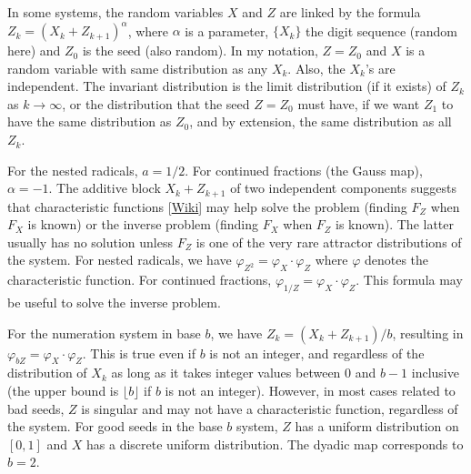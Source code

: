 \documentclass[oneside,10pt]{book}
\begin{document}
In some systems,  the random variables $X$ and $Z$
are linked by the formula $Z_{k} = (X_k +Z_{k+1})^\alpha$, where $\alpha$ is a parameter, $\{X_k\}$ the digit sequence (random here)
 and $Z_0$ is the seed (also random). In my notation, $Z=Z_0$ and $X$ is a random variable with same distribution as any $X_k$.
Also, the $X_k$'s are independent. The \textcolor{index}{invariant distribution} is
 the limit distribution (if it exists) of $Z_k$ as 
$k\rightarrow\infty$, 
 or the distribution that the seed $Z=Z_0$ must have, if we want $Z_1$ to have the same distribution as $Z_0$, and by extension, the same distribution as all $Z_k$.

For the \textcolor{index}{nested radicals}, $a=1/2$. For continued fractions 
(the \textcolor{index}{Gauss map}), $\alpha = -1$. The additive block $X_k + Z_{k+1}$  of two independent components suggests
 that \textcolor{index}{characteristic functions}
 [\href{https://en.wikipedia.org/wiki/Characteristic_function_(probability_theory)}{Wiki}] may help solve the problem (finding $F_Z$ when $F_X$ is known) or
 the inverse problem (finding $F_X$ when $F_Z$ is known). The latter usually has no solution unless 
 $F_Z$ is one of the very rare \textcolor{index}{attractor distributions} of the system.  
For nested radicals, we have $\varphi_{Z^2} = \varphi_X\cdot \varphi_Z$ where $\varphi$ denotes the characteristic function.
  For continued fractions,
 $\varphi_{1/Z} = \varphi_X\cdot \varphi_Z$. This formula may be useful to solve the inverse problem. 

For the numeration system in base $b$,  we have $Z_k = (X_k +Z_{k+1})/b$, resulting 
 in $\varphi_{bZ} = \varphi_X \cdot \varphi_Z$. This is true even if $b$ is not an integer, and regardless of the distribution 
 of $X_k$ as long as it takes integer values between $0$ and $b-1$ inclusive (the upper bound is $\lfloor b\rfloor$ if $b$ is not an integer). 
However, in most cases related to \textcolor{index}{bad seeds}, $Z$ is singular and may not have a characteristic function, regardless of the system. 
For good seeds in the base $b$ system, $Z$ has a uniform distribution on $[0, 1]$ and $X$ has a discrete uniform distribution. 
The \textcolor{index}{dyadic map} corresponds to $b=2$. 
\end{document}
